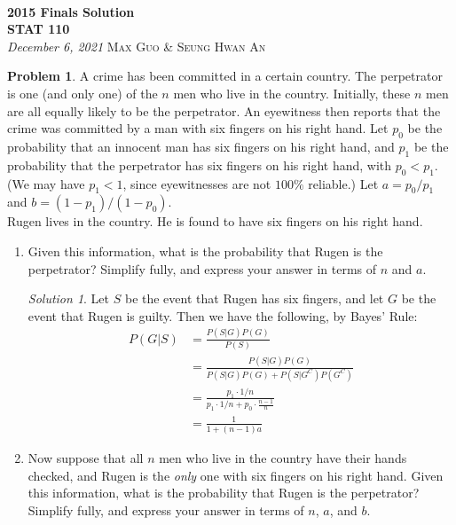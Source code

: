 \documentclass[11pt]{article}
\theoremstyle{definition}
\newtheorem{prob}[theo]{\color{Maroon} Problem}
\theoremstyle{remark}
\newtheorem*{soln}{\color{Maroon} Solution}
\newcommand{\inserttitle}{2015 Finals Solution}
\newcommand{\insertauthor}{Max Guo \& Seung Hwan An}
\newcommand{\insertcourse}{STAT 110}
\begin{document}
{\noindent\Huge\bf  \\[0.1\baselineskip] {\inserttitle }}\\[2\baselineskip]
{{\bf \insertcourse}\\ {\textit{December 6, 2021}}} \hfill {\large \textsc{\insertauthor}}
\smallskip

\begin{prob} A crime has been committed in a certain country. The perpetrator is one (and only one) of the $n$ men who live in the country. Initially, these $n$ men are all equally likely to be the perpetrator. An eyewitness then reports that the crime was committed by a man with six fingers on his right hand. Let $p_0$ be the probability that an innocent man has six fingers on his right hand, and $p_1$ be the probability that the perpetrator has six fingers on his right hand, with $p_0 < p_1$. (We may have $p_1 < 1$, since eyewitnesses are not $100\%$ reliable.) Let $a = p_0 / p_1$ and $b = (1-p_1)/(1 - p_0)$.\\

\noindent
Rugen lives in the country. He is found to have six fingers on his right hand.

\begin{enumerate}[label = (\alph*)]
    \item Given this information, what is the probability that Rugen is the perpetrator? Simplify fully, and express your answer in terms of $n$ and $a$.
    
    \begin{soln} Let $S$ be the event that Rugen has six fingers, and let $G$ be the event that Rugen is guilty. Then we have the following, by Bayes' Rule:
    \begin{align*}
        P(G | S) &= \frac{P(S|G)P(G)}{P(S)} \\
        &= \frac{P(S|G)P(G)}{P(S|G)P(G) + P(S|G^C)P(G^C)} \\
        &= \frac{p_1 \cdot 1/n}{p_1 \cdot 1/n + p_0 \cdot \frac{n-1}{n}} \\
        &= \frac{1}{1 + (n-1)a}
    \end{align*}
    \end{soln}
    
    \dotfill
    
    \item Now suppose that all $n$ men who live in the country have their hands checked, and Rugen is the \textit{only} one with six fingers on his right hand. Given this information, what is the probability that Rugen is the perpetrator? Simplify fully, and express your answer in terms of $n$, $a$, and $b$.
    

\end{enumerate}
\end{prob}
\end{document}
